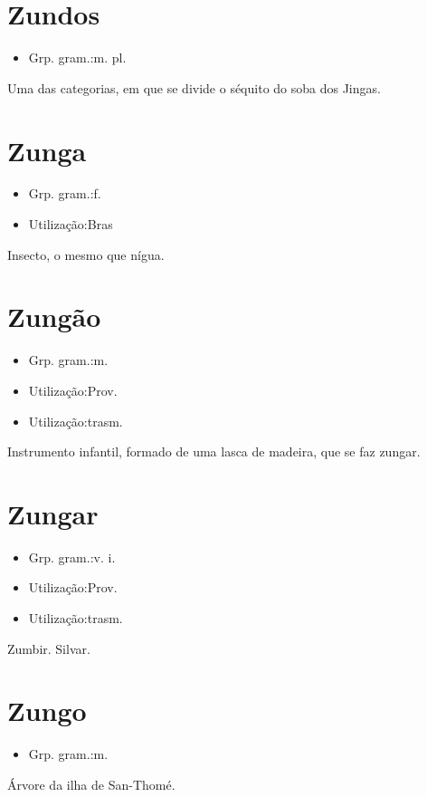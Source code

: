 \section{Zundos}
\begin{itemize}
\item {Grp. gram.:m. pl.}
\end{itemize}
Uma das categorias, em que se divide o séquito do soba dos Jingas.
\section{Zunga}
\begin{itemize}
\item {Grp. gram.:f.}
\end{itemize}
\begin{itemize}
\item {Utilização:Bras}
\end{itemize}
Insecto, o mesmo que \textunderscore nígua\textunderscore .
\section{Zungão}
\begin{itemize}
\item {Grp. gram.:m.}
\end{itemize}
\begin{itemize}
\item {Utilização:Prov.}
\end{itemize}
\begin{itemize}
\item {Utilização:trasm.}
\end{itemize}
Instrumento infantil, formado de uma lasca de madeira, que se faz zungar.
\section{Zungar}
\begin{itemize}
\item {Grp. gram.:v. i.}
\end{itemize}
\begin{itemize}
\item {Utilização:Prov.}
\end{itemize}
\begin{itemize}
\item {Utilização:trasm.}
\end{itemize}
Zumbir.
Silvar.
\section{Zungo}
\begin{itemize}
\item {Grp. gram.:m.}
\end{itemize}
Árvore da ilha de San-Thomé.
